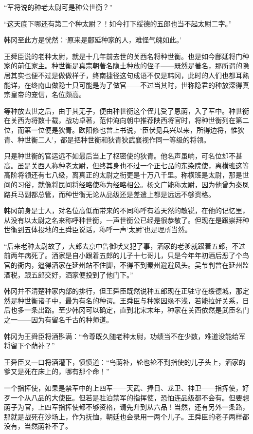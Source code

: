 “军将说的种老太尉可是种公世衡？”

“这天底下哪还有第二个种太尉？！如今打下绥德的五郎也当不起太尉二字。”

韩冈至此方是恍然：‘原来是鄜延种家的人，难怪气魄如此。’

王舜臣说的老种太尉，就是十几年前去世的关西名将种世衡。也是如今鄜延将门种家的前任家主。种世衡是真宗朝著名隐士种放的侄子——既然是著名，那所谓的隐居其实也便不过是做做样子，终南捷径这句成语不仅是韩冈，此时的人们也都耳熟能详，在终南山做隐士只可能是为了做官——不过当其时，世称隐君的种放深得真宗皇帝的宠信，名位颇高。

等种放去世之后，由于其无子，便由种世衡这个侄儿受了恩荫，入了军中。种世衡在关西为将数十载，战功卓著，范仲淹向朝中推荐陕西将官时，将种世衡列在第二位，而第一位便是狄青。欧阳修也曾上书说，‘臣伏见兵兴以来，所得边将，惟狄青、种世衡二人’，都是把种世衡和狄青狄武襄视作同一等级的将领。

只是种世衡的官运远不如最后当上了枢密使的狄青。他名声虽响，可名位却不甚高。虽是关西人称种老太尉，但终其身也不过一个正七品的东染院使，离横班这等高阶将领还有七八级，离真正的太尉之衔更是十万八千里。称横班是太尉，那是世间的习俗，就像将民间将经略使称为经略相公。杨文广能称太尉，因为他曾为秦凤路兵马副都总管，而种世衡无论从品级还是差遣上都是远远不够资格。

韩冈前身是士人，对名位高低而带来的不同称呼有着天然的敏锐，在他的记忆里，从没有以太尉之名来称呼种世衡，一声世衡公已经是很恭敬了。但现在是跟崇拜种世衡到五体投地的王舜臣说话，称呼一声‘太尉’也是理所当然。

“后来老种太尉故了，大郎去京中告御状又犯了事，洒家的老爹就跟着五郎，不过前两年病死了。洒家是自小跟着五郎的儿子十七哥儿，只是今年年初酒后恶了个鸟官的衙内，逼得洒家在延州站不住脚，不得不到秦州避避风头。吴节判曾在延州监酒税，跟五郎交好，洒家便投到了他门下。”

韩冈并不清楚种家内部的排行，但王舜臣既然说种五郎现在正驻守在绥德城，那定然是种世衡诸子中，最为有名的种谔。王舜臣与种家因缘不浅，若能拉好关系，日后也多一条出路。至少韩冈可以确定，直到北宋末年，种家在关西依然是武臣名门之一——因为有留名千古的种师道。

韩冈为王舜臣将酒斟满：“令尊既久随老种太尉，功绩当不在少数，难道没能给军将留下个荫补？”

王舜臣又一口将酒灌下，愤愤道：“鸟荫补，轮也轮不到指使的儿子头上，洒家的爹又是死在床上的，哪有那个命！”

一个指挥使，如果是禁军中的上四军——天武、捧日、龙卫、神卫——指挥使，好歹一个从八品的大使臣。但若是驻泊禁军的指挥使，恐怕连品级都不会有。但要想荫子为官，上四军指挥使都不够资格，请先升到从六品！当然，还有另外一条路，那就是战死在沙场上，作为抚恤，朝廷也会录用一两个儿子。王舜臣的老子两样都没有，当然荫补不了。

